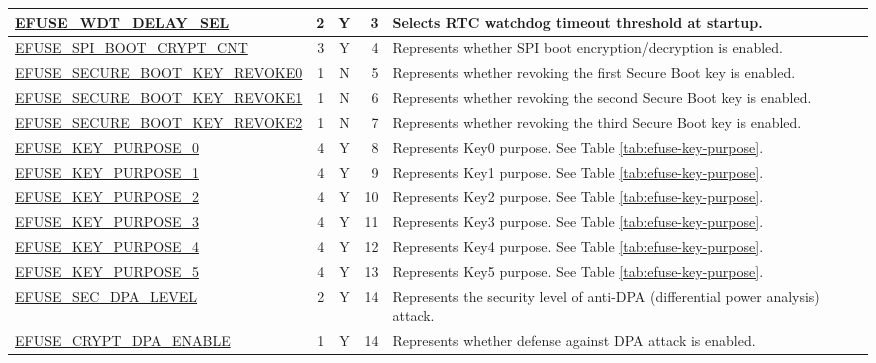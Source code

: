 \begin{longtable}[l]{ |m{8.2cm}|r|c|r|m{9cm}| }
    \hyperref[fielddesc:EFUSEWDTDELAYSEL]{EFUSE\_WDT\_DELAY\_SEL}  & 2 & Y & 3 & Selects RTC watchdog timeout threshold at startup. \\ \hline
    \hyperref[fielddesc:EFUSESPIBOOTCRYPTCNT]{EFUSE\_SPI\_BOOT\_CRYPT\_CNT}  & 3 & Y & 4 & Represents whether SPI boot encryption/decryption is enabled. \\ \hline
    \hyperref[fielddesc:EFUSESECUREBOOTKEYREVOKE0]{EFUSE\_SECURE\_BOOT\_KEY\_REVOKE0}  & 1 & N & 5 & Represents whether revoking the first Secure Boot key is enabled. \\ \hline
    \hyperref[fielddesc:EFUSESECUREBOOTKEYREVOKE1]{EFUSE\_SECURE\_BOOT\_KEY\_REVOKE1}  & 1 & N & 6 & Represents whether revoking the second Secure Boot key is enabled. \\ \hline
    \hyperref[fielddesc:EFUSESECUREBOOTKEYREVOKE2]{EFUSE\_SECURE\_BOOT\_KEY\_REVOKE2}  & 1 & N & 7 & Represents whether revoking the third Secure Boot key is enabled. \\ \hline
    \hyperref[fielddesc:EFUSEKEYPURPOSE0]{EFUSE\_KEY\_PURPOSE\_0}  & 4 & Y & 8 & {Represents Key0 purpose. See Table \ref{tab:efuse-key-purpose}.} \\ \hline
    \hyperref[fielddesc:EFUSEKEYPURPOSE1]{EFUSE\_KEY\_PURPOSE\_1}  & 4 & Y & 9 &{Represents Key1 purpose. See Table \ref{tab:efuse-key-purpose}.} \\ \hline
    \hyperref[fielddesc:EFUSEKEYPURPOSE2]{EFUSE\_KEY\_PURPOSE\_2}  & 4 & Y & 10 & {Represents Key2 purpose. See Table \ref{tab:efuse-key-purpose}.} \\ \hline
    \hyperref[fielddesc:EFUSEKEYPURPOSE3]{EFUSE\_KEY\_PURPOSE\_3}  & 4 & Y & 11 & {Represents Key3 purpose. See Table \ref{tab:efuse-key-purpose}.} \\ \hline
    \hyperref[fielddesc:EFUSEKEYPURPOSE4]{EFUSE\_KEY\_PURPOSE\_4}  & 4 & Y & 12 & {Represents Key4 purpose. See Table \ref{tab:efuse-key-purpose}.} \\ \hline
    \hyperref[fielddesc:EFUSEKEYPURPOSE5]{EFUSE\_KEY\_PURPOSE\_5}  & 4 & Y & 13 & {Represents Key5 purpose. See Table \ref{tab:efuse-key-purpose}.} \\ \hline
    \hyperref[fielddesc:EFUSESECDPALEVEL]{EFUSE\_SEC\_DPA\_LEVEL}  & 2 & Y & 14 & Represents the security level of anti-DPA (differential power analysis) attack. \\ \hline
    \hyperref[fielddesc:EFUSECRYPTDPAENABLE]{EFUSE\_CRYPT\_DPA\_ENABLE}  & 1 & Y & 14 & Represents whether defense against DPA attack is enabled. \\ \hline

\end{longtable}
